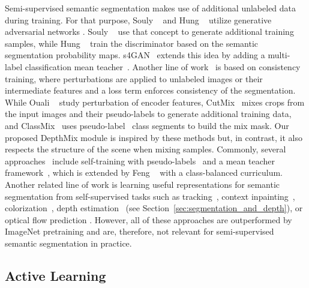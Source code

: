 \documentclass[final]{cvpr}
\begin{document}
Semi-supervised semantic segmentation makes use of additional unlabeled data during training. For that purpose, Souly \etal~\cite{souly2017semi} and Hung \etal~\cite{hung2018adversarial} utilize generative adversarial networks \cite{goodfellow2014generative}. Souly \etal~\cite{souly2017semi} use that concept to generate additional training samples, while Hung \etal~\cite{hung2018adversarial} train the discriminator based on the semantic segmentation probability maps. s4GAN~\cite{mittal2019semi} extends this idea by adding a multi-label classification mean teacher~\cite{tarvainen2017mean}.
Another line of work~\cite{ouali2020semi, french2019consistency, olsson2020classmix} is based on consistency training, where perturbations are applied to unlabeled images or their intermediate features and a loss term enforces consistency of the segmentation. While Ouali \etal~\cite{ouali2020semi} study perturbation of encoder features, CutMix~\cite{french2019consistency} mixes crops from the input images and their pseudo-labels to generate additional training data, and ClassMix~\cite{olsson2020classmix} uses pseudo-label~\cite{lee2013pseudo} class segments to build the mix mask. 
Our proposed DepthMix module is inspired by these methods but, in contrast, it also respects the structure of the scene when mixing samples.
Commonly, several approaches~\cite{mittal2019semi, french2019consistency, olsson2020classmix, feng2020semi} include self-training with pseudo-labels~\cite{lee2013pseudo} and a mean teacher framework~\cite{tarvainen2017mean}, which is extended by Feng \etal~\cite{feng2020semi} with a class-balanced curriculum. Another related line of work is learning useful representations for semantic segmentation from self-supervised tasks such as tracking~\cite{wang2015unsupervised}, context inpainting~\cite{pathak2016context}, colorization~\cite{larsson2017colorization}, depth estimation~\cite{jiang2018self} (see Section~\ref{sec:segmentation_and_depth}), or optical flow prediction \cite{lee2019visuomotor}. However, all of these approaches are outperformed by ImageNet pretraining and are, therefore, not relevant for semi-supervised semantic segmentation in practice.

\subsection{Active Learning}
\end{document}
